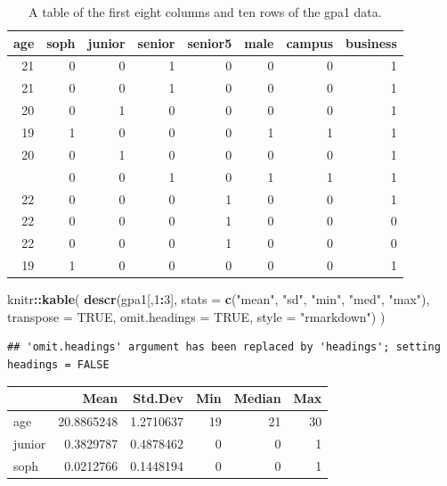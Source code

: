 \documentclass[]{book}
\newenvironment{Shaded}{\begin{snugshade}}{\end{snugshade}}
\newcommand{\DataTypeTok}[1]{\textcolor[rgb]{0.13,0.29,0.53}{#1}}
\newcommand{\DecValTok}[1]{\textcolor[rgb]{0.00,0.00,0.81}{#1}}
\newcommand{\KeywordTok}[1]{\textcolor[rgb]{0.13,0.29,0.53}{\textbf{#1}}}
\newcommand{\NormalTok}[1]{#1}
\newcommand{\OperatorTok}[1]{\textcolor[rgb]{0.81,0.36,0.00}{\textbf{#1}}}
\newcommand{\OtherTok}[1]{\textcolor[rgb]{0.56,0.35,0.01}{#1}}
\newcommand{\StringTok}[1]{\textcolor[rgb]{0.31,0.60,0.02}{#1}}
\begin{document}
\begin{table}[t]

\caption{\label{tab:unnamed-chunk-81}A table of the first eight columns and ten rows of the gpa1 data.}
\centering
\begin{tabular}{rrrrrrrr}
\toprule
age & soph & junior & senior & senior5 & male & campus & business\\
\midrule
21 & 0 & 0 & 1 & 0 & 0 & 0 & 1\\
21 & 0 & 0 & 1 & 0 & 0 & 0 & 1\\
20 & 0 & 1 & 0 & 0 & 0 & 0 & 1\\
19 & 1 & 0 & 0 & 0 & 1 & 1 & 1\\
20 & 0 & 1 & 0 & 0 & 0 & 0 & 1\\
\addlinespace
20 & 0 & 0 & 1 & 0 & 1 & 1 & 1\\
22 & 0 & 0 & 0 & 1 & 0 & 0 & 1\\
22 & 0 & 0 & 0 & 1 & 0 & 0 & 0\\
22 & 0 & 0 & 0 & 1 & 0 & 0 & 0\\
19 & 1 & 0 & 0 & 0 & 0 & 0 & 1\\
\bottomrule
\end{tabular}
\end{table}

\begin{Shaded}
\begin{Highlighting}[]
\NormalTok{knitr}\OperatorTok{::}\KeywordTok{kable}\NormalTok{(}
  \KeywordTok{descr}\NormalTok{(gpa1[,}\DecValTok{1}\OperatorTok{:}\DecValTok{3}\NormalTok{], }\DataTypeTok{stats =} \KeywordTok{c}\NormalTok{(}\StringTok{"mean"}\NormalTok{, }\StringTok{"sd"}\NormalTok{, }\StringTok{"min"}\NormalTok{, }\StringTok{"med"}\NormalTok{, }\StringTok{"max"}\NormalTok{), }\DataTypeTok{transpose =} \OtherTok{TRUE}\NormalTok{, }
        \DataTypeTok{omit.headings =} \OtherTok{TRUE}\NormalTok{, }\DataTypeTok{style =} \StringTok{"rmarkdown"}\NormalTok{)}
\NormalTok{)}
\end{Highlighting}
\end{Shaded}

\begin{verbatim}
## 'omit.headings' argument has been replaced by 'headings'; setting headings = FALSE
\end{verbatim}

\begin{tabular}{l|r|r|r|r|r}
\hline
  & Mean & Std.Dev & Min & Median & Max\\
\hline
age & 20.8865248 & 1.2710637 & 19 & 21 & 30\\
\hline
junior & 0.3829787 & 0.4878462 & 0 & 0 & 1\\
\hline
soph & 0.0212766 & 0.1448194 & 0 & 0 & 1\\
\hline
\end{tabular}
\end{document}
